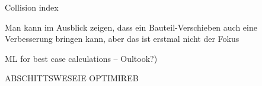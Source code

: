 				
						Collision index


Man kann im Ausblick zeigen, dass ein Bauteil-Verschieben auch eine Verbesserung bringen kann, aber das ist erstmal nicht der Fokus

ML for best case calculations – Oultook?)


ABSCHITTSWESEIE OPTIMIREB